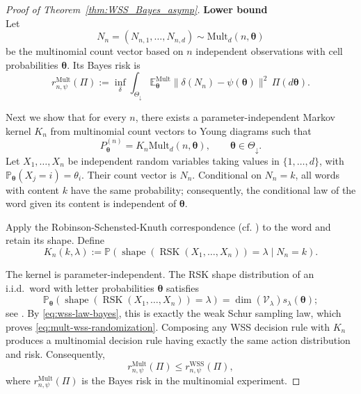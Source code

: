 \documentclass{article}
\theoremstyle{named}
\theoremstyle{named1}
\newcommand{\E}{\mathbb{E}}
\newcommand{\Pp}{\mathbb{P}}
\newcommand{\WSS}{\mathrm{WSS}}
\newcommand{\Mult}{\mathrm{Mult}}
\newcommand{\btheta}{\boldsymbol{\theta}}
\newcommand{\cV}{\mathcal V}
\theoremstyle{plain}
\theoremstyle{remark}
\begin{document}
\begin{proof}[Proof of Theorem~\ref{thm:WSS_Bayes_asymp}]

\textbf{Lower bound}\\

Let
\[
    N_n=(N_{n,1},\ldots,N_{n,d})\sim\Mult_d(n,\btheta)
\]
be the multinomial count vector based on \(n\) independent observations
with cell probabilities \(\btheta\). Its Bayes risk is
\[
    r_{n,\psi}^{\Mult}(\Pi)
    :=\inf_\delta
      \int_{\Theta_{\downarrow}}
      \E_{\btheta}^{\Mult}
      \|\delta(N_n)-\psi(\btheta)\|^2
      \,\Pi(d\btheta).
\]

Next we show that for every \(n\), there exists a parameter-independent Markov kernel
\(K_n\) from multinomial count vectors to Young diagrams such that
\begin{equation}
    P_{\btheta}^{(n)}
    =K_n\Mult_d(n,\btheta),
    \qquad \btheta\in\Theta_{\downarrow}.
\label{eq:mult-wss-randomization}
\end{equation}
Let \(X_1,\ldots,X_n\) be independent random variables taking values
in \(\{1,\ldots,d\}\), with
\(\Pp_{\btheta}(X_j=i)=\theta_i\). Their count vector is \(N_n\).
Conditional on \(N_n=k\), all words with content \(k\) have the same
probability; consequently, the conditional law of the word given its
content is independent of \(\btheta\).

Apply the Robinson-Schensted-Knuth correspondence (cf. \cite{odonnell2016efficient}) to the word and
retain its shape. Define
\[
    K_n(k,\lambda)
    :=\Pp\!\left(
      \operatorname{shape}(\operatorname{RSK}(X_1,\ldots,X_n))
      =\lambda\mid N_n=k
    \right).
\]

The kernel is parameter-independent. The RSK shape distribution of an
i.i.d.\ word with letter probabilities \(\btheta\) satisfies
\[
    \Pp_{\btheta}\!\left(
      \operatorname{shape}(\operatorname{RSK}(X_1,\ldots,X_n))
      =\lambda
    \right)
    =\dim(\cV_\lambda)s_\lambda(\btheta);
\]
see \cite[Section~2, Eq.~(8)]{odonnell2016efficient}.
By \eqref{eq:wss-law-bayes}, this is exactly the weak Schur sampling
law, which proves \eqref{eq:mult-wss-randomization}. Composing any WSS decision rule
with \(K_n\) produces a multinomial decision rule having exactly the
same action distribution and risk.
Consequently,
\begin{equation}
    r_{n,\psi}^{\Mult}(\Pi)
    \leq r_{n,\psi}^{\WSS}(\Pi),
\label{eq:mult-wss-bayes-order}
\end{equation}
where \(r_{n,\psi}^{\Mult}(\Pi)\) is the Bayes risk in the
multinomial experiment.


\end{proof}
\end{document}
